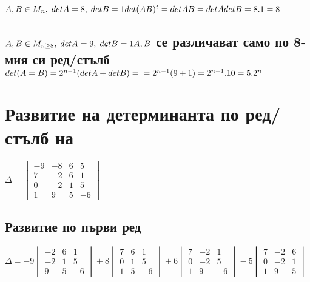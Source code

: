\documentclass{article}
\begin{document}
    \subsection{\(A, B \in M_n, \; detA = 8, \; detB = 1\\ det(AB)^t = detAB = detAdetB = 8.1 = 8\)}
    \subsection{\(A, B \in M_{n \geq 8}, \; detA = 9, \; detB = 1\\ A, B \) се различават само по 8-мия си ред/стълб\\
    \(det(A = B) = 2^{n - 1}(detA + detB) =\\=2^{n - 1}(9 + 1) = 2^{n - 1}.10 = 5.2^n\)}
    \section{Развитие на детерминанта по ред/стълб на}
    \(\Delta = \begin{vmatrix}
        -9 & -8 & 6 & 5\\
        7 & -2 & 6 & 1\\
        0 & -2 & 1 & 5\\
        1 & 9 & 5 & -6
    \end{vmatrix}\)
    \subsection{Развитие по първи ред}
    \(\Delta = -9 \begin{vmatrix}
        -2 & 6 & 1\\
        -2 & 1 & 5\\
         9 & 5 & -6
    \end{vmatrix} + 8 \begin{vmatrix}
        7 & 6 & 1\\
        0 & 1 & 5\\
        1 & 5 & -6
    \end{vmatrix} + 6 \begin{vmatrix}
        7 & -2 & 1\\
        0 & -2 & 5\\
        1 & 9 & -6
    \end{vmatrix} - 5 \begin{vmatrix}
        7 & -2 & 6\\
        0 & -2 & 1\\
        1 & 9 & 5
    \end{vmatrix}\)
\end{document}
